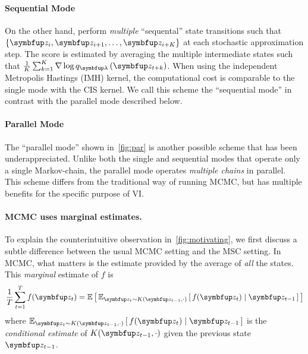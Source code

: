 \paragraph{Sequential Mode}
On the other hand, \citep{pmlr-v124-ou20a} perform \textit{multiple} ``sequental'' state transitions such that \(\{\vz_i, \vz_{i+1},\ldots, \vz_{i+K}\}\) at each stochastic approximation step.
The score is estimated by averaging the multiple intermediate states such that \(\frac{1}{K} \sum_{k=1}^K \nabla \log q_{\vlambda}\left(\vz_{t+k}\right)\).
When using the independent Metropolis Hastings (IMH) kernel, the computational cost is comparable to the single mode with the CIS kernel.
We call this scheme the ``sequential mode'' in contrast with the parallel mode described below.

\paragraph{Parallel Mode}
The ``parallel mode'' shown in~\cref{fig:par} is another possible scheme that has been underappreciated.
Unlike both the single and sequential modes that operate only a single Markov-chain, the parallel mode operates \textit{multiple chains} in parallel.
This scheme differs from the traditional way of running MCMC, but has multiple benefits for the specific purpose of VI.


\paragraph{MCMC uses marginal estimates.}
To explain the counterintuitive observation in~\cref{fig:motivating}, we first discuss a subtle difference between the usual MCMC setting and the MSC setting.
In MCMC, what matters is the estimate provided by the average of \textit{all} the states.
This \textit{marginal} estimate of \(f\) is 
\begin{align}
  \frac{1}{T} \sum^{T}_{t=1} f(\vz_t) %
  = \E{\Esub{\vz_t \sim K(\vz_{t-1},\cdot)}{ f(\vz_t) \mid \vz_{t-1}}}
\end{align}
where \(\Esub{\vz_t \sim K(\vz_{t-1},\cdot)}{ f(\vz_t) \mid \vz_{t-1}}\) is the \textit{conditional estimate} of \(K(\vz_{t-1},\cdot)\) given the previous state \(\vz_{t-1}\).



